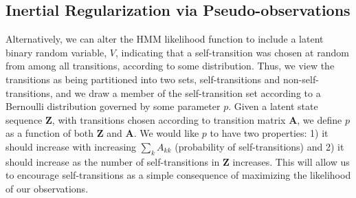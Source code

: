 \documentclass[letterpaper]{article}
\begin{document}
\subsection{Inertial Regularization via Pseudo-observations}

Alternatively, we can alter the HMM likelihood function to include a latent binary random variable,
$V$, indicating that a self-transition was chosen at random from among all transitions, according to some distribution. 
Thus, we view the transitions as being partitioned into two sets, self-transitions and non-self-transitions, and
we draw a member of the self-transition set according to a Bernoulli
distribution governed by some parameter $p$. Given a latent state sequence
$\mathbf{Z}$, with transitions chosen according to transition matrix
$\mathbf{A}$, we define $p$ as a function of both $\mathbf{Z}$ and $\mathbf{A}$.
We would like $p$ to have two properties: 1) it should increase with increasing
$\sum_k A_{kk}$ (probability of self-transitions) and 2) it should increase as
the number of self-transitions in $\mathbf{Z}$ increases. This will allow us to
encourage self-transitions as a simple consequence of maximizing the likelihood
of our observations.
\end{document}
